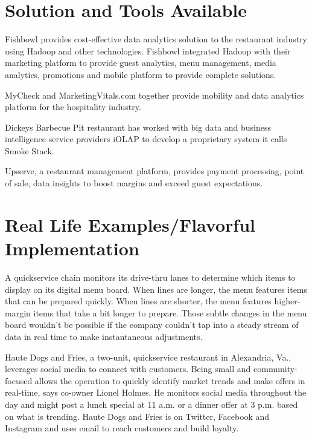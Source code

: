 \documentclass[sigconf]{acmart}
\begin{document}
\section{Solution and Tools Available}
Fishbowl provides cost-effective data analytics solution to the restaurant industry using Hadoop and other technologies. Fishbowl integrated Hadoop with their marketing platform to provide guest analytics, menu management, media analytics, promotions and mobile platform to provide complete solutions.\cite{www-foodnewsfeed}\cite{www-fishbowl}  

MyCheck and MarketingVitals.com together provide mobility and data analytics platform for the hospitality industry. \cite{www-buss} 

Dickeys Barbecue Pit restaurant has worked with big data and business intelligence service providers iOLAP to develop a proprietary system it calls Smoke Stack. \cite{www-forbes}

Upserve, a restaurant management platform, provides payment processing, point of sale, data insights to boost margins and exceed guest expectations.\cite{www-bostonglobe}\cite{www-upserve}


\section{Real Life Examples/Flavorful Implementation}
A quickservice chain monitors its drive-thru lanes to determine which items to display on its digital menu board. When lines are longer, the menu features items that can be prepared quickly. When lines are shorter, the menu features higher-margin items that take a bit longer to prepare. Those subtle changes in the menu board wouldn't be possible if the company couldn't tap into a steady stream of data in real time to make instantaneous adjustments.\cite{www-restaurant}


Haute Dogs and Fries, a two-unit, quickservice restaurant in Alexandria, Va., leverages social media to connect with customers. Being small and community-focused allows the operation to quickly identify market trends and make offers in real-time, says co-owner Lionel Holmes. He monitors social media throughout the day and might post a lunch special at 11 a.m. or a dinner offer at 3 p.m. based on what is trending. Haute Dogs and Fries is on Twitter, Facebook and Instagram and uses email to reach customers and build loyalty.\cite{www-restaurant}
\end{document}
